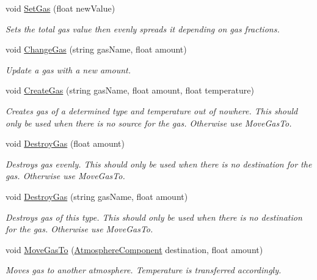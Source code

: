 \begin{DoxyCompactItemize}
void \hyperlink{class_atmosphere_component_a84ad0d10ca2c978df17736750cb4ac61}{Set\+Gas} (float new\+Value)
\begin{DoxyCompactList}\small\item\em Sets the total gas value then evenly spreads it depending on gas fractions. \end{DoxyCompactList}\item 
void \hyperlink{class_atmosphere_component_a5cf504fc9a6e6dda40e0d978826f3b1b}{Change\+Gas} (string gas\+Name, float amount)
\begin{DoxyCompactList}\small\item\em Update a gas with a new amount. \end{DoxyCompactList}\item 
void \hyperlink{class_atmosphere_component_a96f96d66987e071cf9c686d807aa699d}{Create\+Gas} (string gas\+Name, float amount, float temperature)
\begin{DoxyCompactList}\small\item\em Creates gas of a determined type and temperature out of nowhere. This should only be used when there is no source for the gas. Otherwise use Move\+Gas\+To. \end{DoxyCompactList}\item 
void \hyperlink{class_atmosphere_component_a0c4f4a859c0a5ad8cd35374989aeecdf}{Destroy\+Gas} (float amount)
\begin{DoxyCompactList}\small\item\em Destroys gas evenly. This should only be used when there is no destination for the gas. Otherwise use Move\+Gas\+To. \end{DoxyCompactList}\item 
void \hyperlink{class_atmosphere_component_ae48468d3e0f6e6aedffd3e3dcb418800}{Destroy\+Gas} (string gas\+Name, float amount)
\begin{DoxyCompactList}\small\item\em Destroys gas of this type. This should only be used when there is no destination for the gas. Otherwise use Move\+Gas\+To. \end{DoxyCompactList}\item 
void \hyperlink{class_atmosphere_component_a8f0b2f406c993dff7c315e43624775b0}{Move\+Gas\+To} (\hyperlink{class_atmosphere_component}{Atmosphere\+Component} destination, float amount)
\begin{DoxyCompactList}\small\item\em Moves gas to another atmosphere. Temperature is transferred accordingly. \end{DoxyCompactList}\item 

\end{DoxyCompactItemize}
